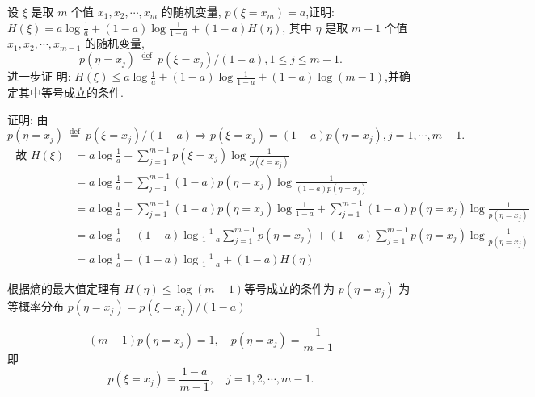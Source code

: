   \begin{exercise}
设 $ \xi $ 是取 $ m $ 个值 $ x_{1}, x_{2}, \cdots, x_{m} $ 的随机变量, $ p\left(\xi=x_{m}\right)=a $,证明: $ H(\xi)=a \log \frac{1}{a}+(1-a) \log \frac{1}{1-a}+(1-a) H(\eta) $, 其中 $ \eta $ 是取 $ m-1 $ 个值 $ x_{1}, x_{2}, \cdots, x_{m-1} $ 的随机变量,
$$
p\left(\eta=x_{j}\right) \stackrel{\text { def }}{=} p\left(\xi=x_{j}\right) /(1-a), 1 \leqslant j \leqslant m-1 .
$$
进一步证
明: $ H(\xi) \leqslant a \log \frac{1}{a}+(1-a) \log \frac{1}{1-a}+(1-a) \log (m-1) $,并确定其中等号成立的条件.
 \end{exercise}
 \begin{solution}
     证明: 由 $ p\left(\eta=x_{j}\right) \stackrel{\text { def }}{=} p\left(\xi=x_{j}\right) /(1-a)  \Rightarrow p\left(\xi=x_{j}\right)=(1-a) p\left(\eta=x_{j}\right), j=1, \cdots, m-1 . $
$$
\begin{aligned}
\text { 故 } H(\xi)&=a \log \frac{1}{a}+\sum_{j=1}^{m-1} p\left(\xi=x_{j}\right) \log \frac{1}{p\left(\xi=x_{j}\right)} \\
&=a \log \frac{1}{a}+\sum_{j=1}^{m-1}(1-a) p\left(\eta=x_{j}\right) \log \frac{1}{(1-a) p\left(\eta=x_{j}\right)}\\
&=a \log \frac{1}{a}+\sum_{j=1}^{m-1}(1-a) p\left(\eta=x_{j}\right) \log \frac{1}{1-a} +\sum_{j=1}^{m-1}(1-a) p\left(\eta=x_{j}\right) \log \frac{1}{p\left(\eta=x_{j}\right)} \\
&=a \log \frac{1}{a}+(1-a) \log \frac{1}{1-a} \sum_{j=1}^{m-1} p\left(\eta=x_{j}\right) +(1-a) \sum_{j=1}^{m-1} p\left(\eta=x_{j}\right) \log \frac{1}{p\left(\eta=x_{j}\right)} \\
&=a \log \frac{1}{a}+(1-a) \log \frac{1}{1-a}+(1-a) H(\eta)
\end{aligned}
$$

根据熵的最大值定理有 $ H(\eta) \leqslant \log (m-1) $等号成立的条件为 $ p\left(\eta=x_{j}\right) $ 为等概率分布 $ p\left(\eta=x_{j}\right)=p\left(\xi=x_{j}\right) /(1-a) $

$$
(m-1) p\left(\eta=x_{j}\right)=1 ,\quad p\left(\eta=x_{j}\right)=\frac{1}{m-1} 
$$
即$$
 p\left(\xi=x_{j}\right)=\frac{1-a}{m-1}, \quad j=1,2, \cdots, m-1 .
$$
 \end{solution}

